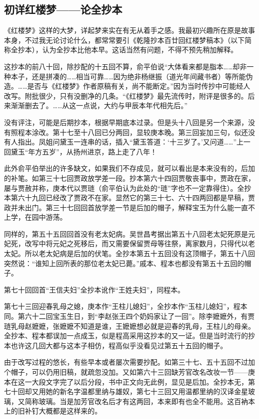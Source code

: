 \subsection{初详红楼梦——论全抄本}


\par 《红楼梦》这样的大梦，详起梦来实在有无从着手之感。我最初兴趣所在原是故事本身，不过我无论讨论什么，都常常要引《乾隆抄本百廿回红楼梦稿本》（以下简称全抄本），认为全抄本比他本早。这话当然有问题，不得不预先稍加解释。
\par 这抄本的前八十回，除抄配的十五回不算，俞平伯说“大体看来都是脂本……却非一种本子，还是拼凑的……相当可靠……因为绝非杨继振（道光年间藏书者）等所能伪造。……是否与《红楼梦》作者原稿有关，尚不能断定。”因为当时传抄中可能经人改写。附批很少，只有没删净的几条。“《红楼梦》最先流传时，附评是很多的。后来渐渐删去了。……从这一点说，大约与甲辰本年代相先后。”
\par 没有评注，可能是后期抄本，根据早期底本过录。但是头十八回是另一个来源，没有照程本涂改。第十七至十八回已分两回，显较庚本晚。第三回妄加三句，似还没有人指出。凤姐问黛玉一连串的话，插入“黛玉答道：‘十三岁了。’又问道……”上一回黛玉“年方五岁”，从扬州进京，路上走了八年！
\par 此外俞平伯举出的许多缺文，如果我们不存成见，就可以看出是本来没有的，后加的补笔。如第三十七回贾政放学差一段。抄本第六十四回贾敬丧事中，贾政在家，屡与贾赦并称，庚本代以贾琏（俞平伯认为此处的“琏”字也不一定靠得住）。全抄本第六十九回已经改了贾政不在家。显然它的第三十七、六十四两回都是早稿，贾政并未出门。第三十七回回首放学差一节是后加的帽子，解释宝玉为什么能一直不上学，在园中游荡。
\par 同样的，第五十五回回首没有老太妃病。吴世昌考据出第五十八回老太妃死原是元妃死，改写中将元妃之死移后，而又需要保留贾母等往祭，离家数月，只得代以老太妃。所以老太妃病是后加的伏笔。全抄本第五十五回没有这顶帽子，第五十八回突然说：“谁知上回所表的那位老太妃已薨。”戚本、程本也都没有第五十五回的帽子。
\par 第七十回回首“王信夫妇”全抄本讹作“王姓夫妇”，同程本。
\par 第七十三回迎春乳母之媳，庚本作“王柱儿媳妇”，全抄本作“玉柱儿媳妇”，程本同。第六十二回宝玉生日，到“李赵张王四个奶妈家让了一回”。除李嬷嬷外，有贾琏乳母赵嬷嬷，张嬷嬷不知道是谁，王嬷嬷想必就是迎春的乳母，王柱儿的母亲。全抄本、程本都误加一点成玉，似是程高采用这抄本的又一证。但是当时流行的抄本也许这几回大都与这本子相仿，程高似乎没看见过第五十五回的帽子。
\par 由于改写过程的悠长，有些早本或者屡次需要抄配。如第三十七、五十五回不过加个帽子，可以仍用旧稿，就疏忽没加。又如第六十三回缺芳官改名改妆一节——庚本在这一大段文字完了以后分段，书中正文向无此例，显见是后加。全抄本无，第七十回却又用她的新名字温都里纳与雄奴，第七十三回又用温都里纳的汉译金星玻璃，又简称玻璃。当是加芳官改名后才有这两回，本来即有也全不能用。这百衲本上的旧补钉大概都是这样来的。
